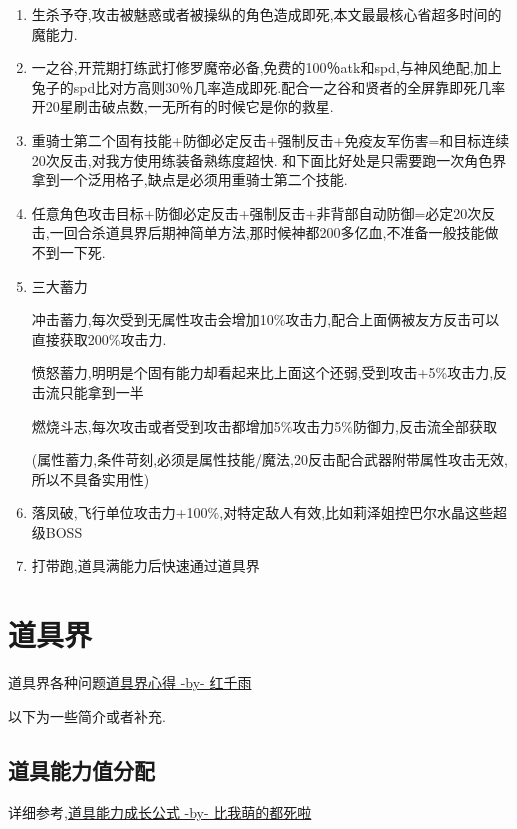 	\begin{enumerate}
		\item
		生杀予夺,攻击被魅惑或者被操纵的角色造成即死,本文最最核心省超多时间的魔能力.
		\item
		一之谷,开荒期打练武打修罗魔帝必备,免费的100％atk和spd,与神风绝配,加上兔子的spd比对方高则30％几率造成即死.配合一之谷和贤者的全屏靠即死几率开20星刷击破点数,一无所有的时候它是你的救星.
		\item
		重骑士第二个固有技能+防御必定反击+强制反击+免疫友军伤害=和目标连续20次反击,对我方使用练装备熟练度超快.
		和下面比好处是只需要跑一次角色界拿到一个泛用格子,缺点是必须用重骑士第二个技能.
		\item
		任意角色攻击目标+防御必定反击+强制反击+非背部自动防御=必定20次反击,一回合杀道具界后期神简单方法,那时候神都200多亿血,不准备一般技能做不到一下死.
		\item
		三大蓄力

		冲击蓄力,每次受到无属性攻击会增加10\%攻击力,配合上面俩被友方反击可以直接获取200\%攻击力.

		愤怒蓄力,明明是个固有能力却看起来比上面这个还弱,受到攻击+5\%攻击力,反击流只能拿到一半

		燃烧斗志,每次攻击或者受到攻击都增加5\%攻击力5\%防御力,反击流全部获取

		(属性蓄力,条件苛刻,必须是属性技能/魔法,20反击配合武器附带属性攻击无效,所以不具备实用性)

		\item
		落凤破,飞行单位攻击力+100\%,对特定敌人有效,比如莉泽姐控巴尔水晶这些超级BOSS

		\item
		打带跑,道具满能力后快速通过道具界

	\end{enumerate}
	
	\newpage

	\section{道具界}

	道具界各种问题\href{http://tieba.baidu.com/p/3730196003}{道具界心得 -by- 红千雨}

	以下为一些简介或者补充.

	\subsection{道具能力值分配}
	
	详细参考,\href{http://tieba.baidu.com/f?kz=3834692385}{道具能力成长公式 -by- 比我萌的都死啦}

